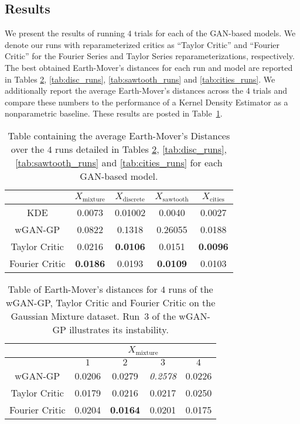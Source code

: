 \documentclass[letterpaper]{article} %
\begin{document}
\subsection{Results}

We present the results of running $4$ trials for each of the GAN-based models.
We denote our runs with reparameterized critics as ``Taylor Critic'' and ``Fourier Critic'' for the Fourier Series and Taylor Series reparameterizations, respectively. The best obtained Earth-Mover's distances for each run and model are reported in Tables \ref{tab:gm_runs}, \ref{tab:disc_runs}, \ref{tab:sawtooth_runs} and \ref{tab:cities_runs}. We additionally report the average Earth-Mover's distances across the 4 trials and compare these numbers to the performance of a Kernel Density Estimator as a nonparametric baseline. These results are posted in Table~\ref{tab:average_results}.
\begin{table}[!htb]
\centering
\begin{tabular}{||c||c|c|c|c||}
\hline
 & $X_\text{mixture}$ & $X_\text{discrete}$ & $X_\text{sawtooth}$ & $X_\text{cities}$ \\ [0.5ex]
 \hline\hline
 KDE & 0.0073 & 0.01002 & 0.0040 & 0.0027
 \\
 \hline
 wGAN-GP & 0.0822 & 0.1318 & 0.26055 & 0.0188 \\
 \hline
 Taylor Critic & 0.0216 & \textbf{0.0106} & 0.0151 & \textbf{0.0096} \\
 \hline
 Fourier Critic & \textbf{0.0186} & 0.0193 & \textbf{0.0109} & 0.0103 \\
 \hline
\end{tabular}
    \caption{Table containing the average Earth-Mover's Distances over the $4$ runs detailed in Tables \ref{tab:gm_runs}, \ref{tab:disc_runs}, \ref{tab:sawtooth_runs} and \ref{tab:cities_runs} for each GAN-based model.}\label{tab:average_results}
\end{table}

\begin{table}[!htb]
\centering
\begin{tabular}{||c||c|c|c|c||}
\hline
& \multicolumn{4}{c||}{$X_\text{mixture}$} \\
\hline
 & $1$ & $2$ & $3$ & $4$ \\ [0.5ex]
 \hline\hline
 wGAN-GP & 0.0206 & 0.0279 & \emph{0.2578} & 0.0226 \\
 \hline
 Taylor Critic & 0.0179 & 0.0216 & 0.0217 & 0.0250 \\
 \hline
 Fourier Critic & 0.0204 & \textbf{0.0164} & 0.0201 & 0.0175 \\
 \hline
\end{tabular}
    \caption{Table of Earth-Mover's distances for $4$ runs of the wGAN-GP, Taylor Critic and Fourier Critic on the Gaussian Mixture dataset. Run~3 of the wGAN-GP illustrates its instability.}\label{tab:gm_runs}
\end{table}
\end{document}
